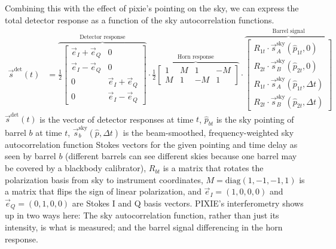 \documentclass{article}
\begin{document}
Combining this with the effect of pixie's pointing on the sky,
we can express the total detector response as a function of the
sky autocorrelation functions.
\begin{align}
\vec s^\textrm{det}(t) &= \overbrace{\frac12\begin{bmatrix}
	\vec e_I+\vec e_Q & 0 \\
	\vec e_I-\vec e_Q & 0 \\
	0 & \vec e_I+\vec e_Q  \\
	0 & \vec e_I-\vec e_Q \end{bmatrix}}^\textrm{Detector response}
	\cdot
	\overbrace{\frac12\begin{bmatrix}
	1 &  M &  1 & -M \\
	M &  1 & -M &  1
	\end{bmatrix}}^\textrm{Horn response}
	\cdot
	\overbrace{\begin{bmatrix}
	R_{1t}\cdot\vec s^\textrm{sky}_A(\hat p_{1t},0) \\
	R_{2t}\cdot\vec s^\textrm{sky}_B(\hat p_{2t},0) \\
	R_{1t}\cdot\vec s^\textrm{sky}_A(\hat p_{1t},\Delta t) \\
	R_{2t}\cdot\vec s^\textrm{sky}_B(\hat p_{2t},\Delta t)
	\end{bmatrix}}^\textrm{Barrel signal}
	\label{eq:response}
\end{align}
$\vec s^\textrm{det}(t)$ is the vector of
detector responses at time $t$,
$\hat p_{bt}$ is the sky pointing of barrel $b$ at time $t$,
$\vec s^\textrm{sky}_b(\hat p,\Delta t)$ is the beam-smoothed,
frequency-weighted sky autocorrelation
function Stokes vectors for the given pointing and time delay as
seen by barrel $b$
(different barrels can see different skies because one barrel may
be covered by a blackbody calibrator),
$R_{bt}$ is
a matrix that rotates the polarization basis from sky to instrument
coordinates, $M = \textrm{diag}(1,-1,-1,1)$ is a matrix that flips
the sign of linear polarization,
and $\vec e_I = (1,0,0,0)$ and $\vec e_Q = (0,1,0,0)$ are Stokes
I and Q basis vectors. PIXIE's interferometry shows up in two ways here:
The sky autocorrelation function, rather than just its intensity,
is what is measured; and the barrel signal differencing in the horn
response.
\end{document}
